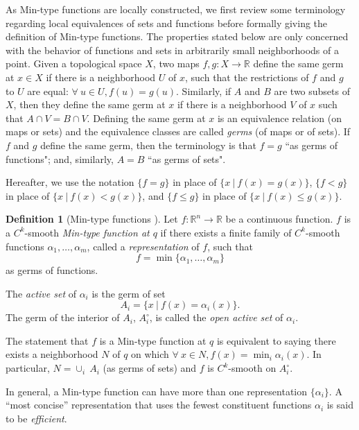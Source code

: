 \documentclass[11pt]{article}
\newcommand{\R}{\mathbb{R}}
\newcommand{\inter}{\cap}
\newcommand{\union}{\cup}
\theoremstyle{plain}
\theoremstyle{definition}
\newtheorem{defi}{Definition}
\theoremstyle{remark}
\begin{document}
	As Min-type functions are locally constructed, we first review some terminology regarding local equivalences of sets and functions before formally giving the definition of Min-type functions. The properties stated below are only concerned with the behavior of functions and sets in arbitrarily small neighborhoods of a point. Given a topological space $X$, two maps $f, g : X \to \R$ define the same germ at $x \in X$ if there is a neighborhood $U$ of $x$, such that the restrictions of $f$ and $g$ to $U$ are equal: $\forall\ u \in U, f(u) = g(u)$.
	Similarly, if $A$ and $B$ are two subsets of $X$, then they define the same germ at $x$ if there is a neighborhood $V$ of $x$ such that $A \inter V = B \inter V$.
	Defining the same germ at $x$ is an equivalence relation (on maps or sets) and the equivalence classes are called \textit{germs} (of maps or of sets). If $f$ and $g$ define the same germ, then the terminology is that $f = g$ ``as germs of functions"; and, similarly, $A = B$ ``as germs of sets".
	
	Hereafter, we use the notation $\{f = g\}$ in place of $\{x ~|~ f(x) = g(x)\}$, $\{f < g\}$ in place of $\{x ~|~ f(x) < g(x)\}$, and $\{f \leq g\}$ in place of $\{x ~|~ f(x) \leq g(x)\}$.
	
	\begin{defi}[Min-type functions \citep{gershkovich_morse_1997}]
		\label{def:min_type}
		Let $f : \R^n \to \R$ be a continuous function. $f$ is a $C^k$-smooth \emph{Min-type function at $q$} if there exists a finite family of $C^k$-smooth functions $\alpha_1, \ldots, \alpha_m$, called a \emph{representation} of $f$, such that 
		\[f = \min \{\alpha_1,\ldots,\alpha_m\} \]
		as germs of functions.
	\end{defi}
	
	The \emph{active set} of $\alpha_i$ is the germ of set
	\[A_i = \{x ~|~ f(x) = \alpha_i(x)\}.\]
	The germ of the interior of $A_i$, $A_i^\circ$, is called the \emph{open active set} of $\alpha_i$.
	
	The statement that $f$ is a Min-type function at $q$ is equivalent to saying there exists a neighborhood $N$ of $q$ on which $\forall\ x \in N, f(x) = \min_{i} \alpha_i(x)$.
	In particular, $N = \union_i ~ A_i$ (as germs of sets) and $f$ is $C^k$-smooth on $A_i^\circ$.
	
	In general, a Min-type function can have more than one representation $\{ \alpha_i \}$. A ``most concise'' representation that uses the fewest constituent functions $\alpha_i$ is said to be \emph{efficient}.
	
\end{document}
